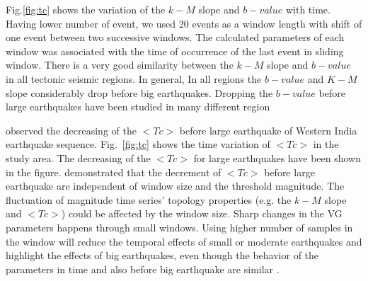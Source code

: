 \noindent 
Fig.\ref{fig:tc}  shows the variation of the $k-M$ slope and $b-value$ with time. Having lower number of event, we used 20 events as a window length with shift of one event between two successive windows. The calculated parameters of each window was associated with the time of occurrence of the last event in sliding window. There is a very good similarity between the $k-M$ slope and $b-value$ in all tectonic seismic regions. In general, In all regions the $b-value$ and $K-M$ slope considerably drop before big earthquakes. Dropping the $b-value$ before large earthquakes have been studied in many different region \citep[e.g.][]{Wyss2000,Wyss2006,Schorlemmer2005,Chan2012}

\noindent
\citet{Telesca2016} observed the decreasing of the $<Tc>$ before large earthquake of Western India earthquake sequence. Fig.~\ref{fig:tc} shows the time variation of $<Tc>$ in the study area. The decreasing of the $<Tc>$ for large earthquakes have been shown in the figure. \citet{Telesca2016} demonstrated that the decrement of $<Tc>$ before large earthquake are independent of window size and the threshold magnitude. The fluctuation of magnitude time series' topology properties (e.g. the $k-M$ slope and $<Tc>$) could be affected by the window size. Sharp changes in the VG parameters happens through small windows. Using higher number of samples in the window will reduce the temporal effects of small or moderate earthquakes and highlight the effects of big earthquakes, even though the behavior of the parameters in time and also before big earthquake are similar \citep{Telesca2016}. %
 

